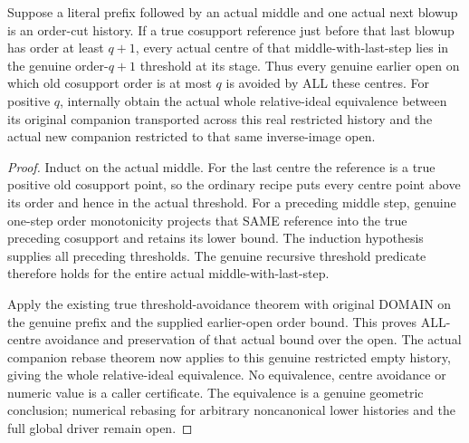 \begin{theorem}
\label{hir:original-finite-order-cut-companion-rebase}
\leanok
Suppose a literal prefix followed by an actual middle and one actual next
blowup is an order-cut history. If a true cosupport reference just before
that last blowup has order at least $q+1$, every actual centre of that
middle-with-last-step lies in the genuine order-$q+1$ threshold at its
stage. Thus every genuine earlier open on which old cosupport order is
at most $q$ is avoided by ALL these centres. For positive $q$, internally
obtain the actual whole relative-ideal equivalence between its original
companion transported across this real restricted history and the actual
new companion restricted to that same inverse-image open.
\end{theorem}
\begin{proof}
Induct on the actual middle. For the last centre the reference is a true
positive old cosupport point, so the ordinary recipe puts every centre
point above its order and hence in the actual threshold. For a preceding
middle step, genuine one-step order monotonicity projects that SAME
reference into the true preceding cosupport and retains its lower bound.
The induction hypothesis supplies all preceding thresholds. The genuine
recursive threshold predicate therefore holds for the entire actual
middle-with-last-step.

Apply the existing true threshold-avoidance theorem with original DOMAIN
on the genuine prefix and the supplied earlier-open order bound. This
proves ALL-centre avoidance and preservation of that actual bound over
the open. The actual companion rebase theorem now applies to this genuine
restricted empty history, giving the whole relative-ideal equivalence.
No equivalence, centre avoidance or numeric value is a caller certificate.
The equivalence is a genuine geometric conclusion; numerical rebasing for
arbitrary noncanonical lower histories and the full global driver remain
open.
\end{proof}
